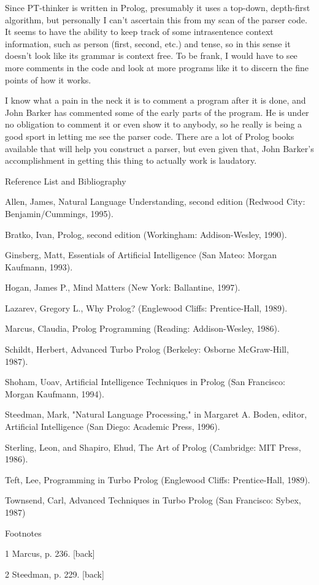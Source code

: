 Since PT-thinker is written in Prolog, presumably it uses a top-down, depth-first algorithm, but personally I can't ascertain this from my scan of the parser code. It seems to have the ability to keep track of some intrasentence context information, such as person (first, second, etc.) and tense, so in this sense it doesn't look like its grammar is context free. To be frank, I would have to see more comments in the code and look at more programs like it to discern the fine points of how it works.

I know what a pain in the neck it is to comment a program after it is done, and John Barker has commented some of the early parts of the program. He is under no obligation to comment it or even show it to anybody, so he really is being a good sport in letting me see the parser code. There are a lot of Prolog books available that will help you construct a parser, but even given that, John Barker's accomplishment in getting this thing to actually work is laudatory.

Reference List and Bibliography

Allen, James, Natural Language Understanding, second edition (Redwood City: Benjamin/Cummings, 1995). 

Bratko, Ivan, Prolog, second edition (Workingham: Addison-Wesley, 1990). 

Ginsberg, Matt, Essentials of Artificial Intelligence (San Mateo: Morgan Kaufmann, 1993). 

Hogan, James P., Mind Matters (New York: Ballantine, 1997). 

Lazarev, Gregory L., Why Prolog? (Englewood Cliffs: Prentice-Hall, 1989). 

Marcus, Claudia, Prolog Programming (Reading: Addison-Wesley, 1986). 

Schildt, Herbert, Advanced Turbo Prolog (Berkeley: Osborne McGraw-Hill, 1987). 

Shoham, Uoav, Artificial Intelligence Techniques in Prolog (San Francisco: Morgan Kaufmann, 1994). 

Steedman, Mark, "Natural Language Processing," in Margaret A. Boden, editor, Artificial Intelligence (San Diego: Academic Press, 1996). 

Sterling, Leon, and Shapiro, Ehud, The Art of Prolog (Cambridge: MIT Press, 1986). 

Teft, Lee, Programming in Turbo Prolog (Englewood Cliffs: Prentice-Hall, 1989). 

Townsend, Carl, Advanced Techniques in Turbo Prolog (San Francisco: Sybex, 1987) 

Footnotes

1 Marcus, p. 236. [back]

2 Steedman, p. 229. [back]
